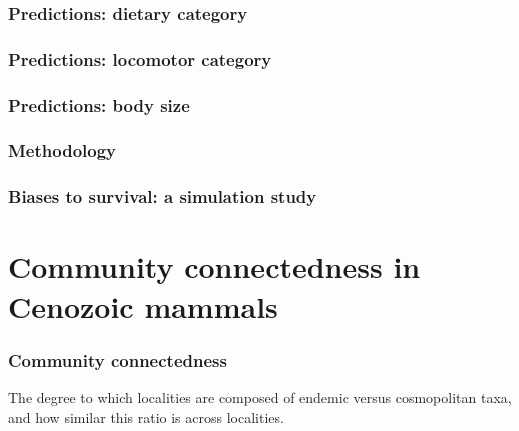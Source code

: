 \documentclass{beamer} \usepackage{amsmath,amsthm}
\begin{document}
\begin{frame}
  \frametitle{Predictions: dietary category}
\end{frame}

\begin{frame}
  \frametitle{Predictions: locomotor category}
\end{frame}

\begin{frame}
  \frametitle{Predictions: body size}
\end{frame}

\begin{frame}
  \frametitle{Methodology}
\end{frame}

\begin{frame}
  \frametitle{Biases to survival: a simulation study}
\end{frame}

\section{Community connectedness in Cenozoic mammals}

\begin{frame}
  \frametitle{Community connectedness}
  \begin{definition}
    The degree to which localities are composed of endemic versus cosmopolitan taxa, and how similar this ratio is across localities.
  \end{definition}
\end{frame}
\end{document}
